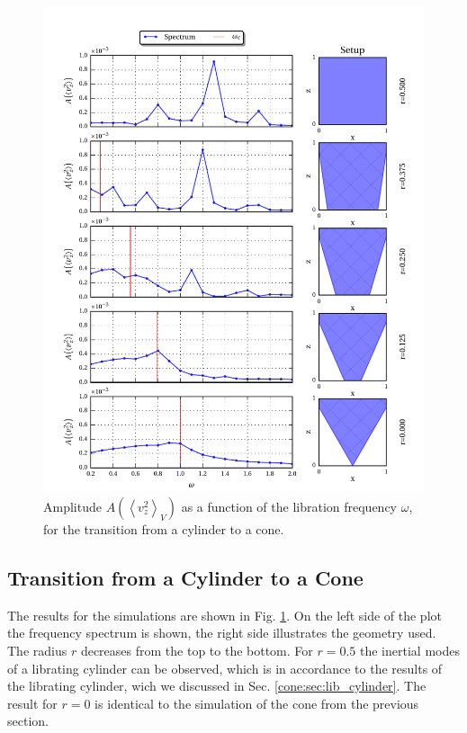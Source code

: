 \begin{figure}[!pt]
  \centering
  \includegraphics{gfx/cone/transition/transition.pdf}
  \caption{\label{fig:cone:transition}
      Amplitude $A\left(\left<v^2_z\right>_V\right)$ as a function of the libration frequency $\omega$,
      for the transition from a cylinder to a cone.
  }
\end{figure}

\clearpage
\subsection{Transition from a Cylinder to a Cone }

The results for the simulations are shown in Fig. \ref{fig:cone:transition}.
On the left side of the plot  the frequency spectrum is shown, the right side illustrates the geometry used.
The radius $r$ decreases from the top to the bottom.
For $r=0.5$  the inertial modes of a librating cylinder can be observed, which is in accordance
to the results of the librating  cylinder, wich we discussed in Sec. \ref{cone:sec:lib_cylinder}.
The result for $r=0$ is identical to the simulation of the cone from the previous section.

